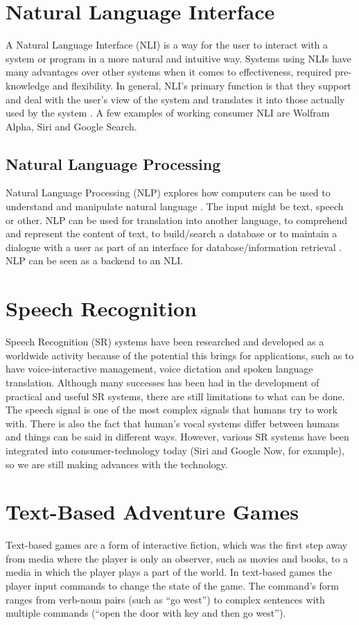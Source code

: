 \section{Natural Language Interface}
A Natural Language Interface (NLI) is a way for the user to interact with a system or program in a more natural and intuitive way. Systems using NLIs have many advantages over other systems when it comes to effectiveness, required pre-knowledge and flexibility. In general, NLI’s primary function is that they support and deal with the user’s view of the system and translates it into those actually used by the system \citep{Hend}. A few examples of working consumer NLI are Wolfram Alpha, Siri and Google Search.

\subsection{Natural Language Processing}
Natural Language Processing (NLP) explores how computers can be used to understand and manipulate natural language \citep{Gobi}. The input might be text, speech or other. NLP can be used for translation into another language, to comprehend and represent the content of text, to build/search a database or to maintain a dialogue with a user as part of an interface for database/information retrieval \citep{Allen}. NLP can be seen as a backend to an NLI.

\section{Speech Recognition}
Speech Recognition (SR) systems have been researched and developed as a worldwide activity because of the potential this brings for applications, such as to have voice-interactive management, voice dictation and spoken language translation. Although many successes has been had in the development of practical and useful SR systems, there are still limitations to what can be done. The speech signal is one of the most complex signals that humans try to work with. There is also the fact that human’s vocal systems differ between humans and things can be said in different ways. However, various SR systems have been integrated into consumer-technology today (Siri and Google Now, for example), so we are still making advances with the technology. \citep{SR}

\section{Text-Based Adventure Games}
Text-based games are a form of interactive fiction, which was the first step away from media where the player is only an observer, such as movies and books, to a media in which the player plays a part of the world. In text-based games the player input commands to change the state of the game. The command's form ranges from verb-noun pairs (such as ``go west'') to complex sentences with multiple commands (``open the door with key and then go west'').\citep[page 54-55]{Sweet}

